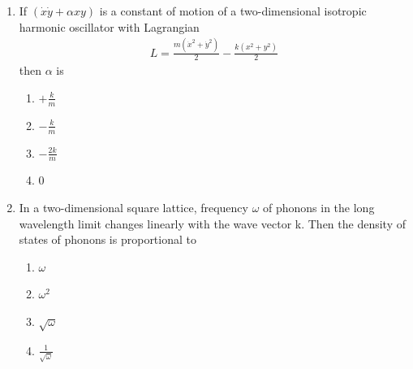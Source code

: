\documentclass[journal,12pt,onecolumn]{IEEEtran}
\theoremstyle{remark}
\begin{document}
\begin{enumerate}
\item
If $(\dot{x}\dot{y} + \alpha xy)$ is a constant of motion of a two-dimensional isotropic harmonic oscillator with Lagrangian \begin{align*}L = \frac{m(\dot{x}^2 + \dot{y}^2)}{2} - \frac{k(x^2 + y^2)}{2}\end{align*} then $\alpha$ is
\begin{enumerate}
    \item $+\frac{k}{m}$
    \item $-\frac{k}{m}$
    \item $-\frac{2k}{m}$
    \item $0$
\end{enumerate}


\item
In a two-dimensional square lattice, frequency $\omega$ of phonons in the long wavelength limit changes linearly with the wave vector k. Then the density of states of phonons is proportional to
\begin{enumerate}
    \item $\omega$
    \item $\omega^2$
    \item $\sqrt{\omega}$
    \item $\frac{1}{\sqrt{\omega}}$
\end{enumerate}



\end{enumerate}
\end{document}
